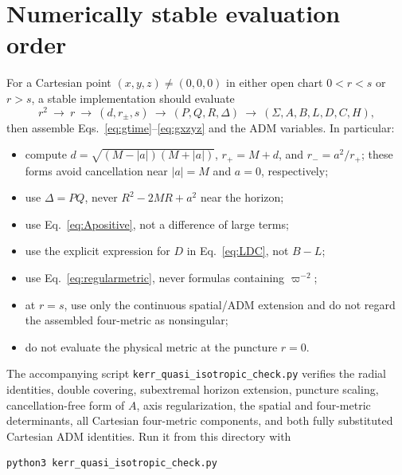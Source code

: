 \documentclass[11pt]{article}
\newcommand{\RBL}{R}
\newcommand{\vpi}{\varpi}
\begin{document}
\section{Numerically stable evaluation order}

For a Cartesian point $(x,y,z)\neq(0,0,0)$ in either open chart $0<r<s$ or $r>s$, a stable implementation should evaluate
\begin{equation}
 r^2\ \longrightarrow\ r\ \longrightarrow\ (d,r_\pm,s)\ \longrightarrow\
 (P,Q,\RBL,\Delta)\ \longrightarrow\ (\Sigma,A,B,L,D,C,H), \label{eq:evalorder}
\end{equation}
then assemble Eqs.~\eqref{eq:gtime}--\eqref{eq:gxzyz} and the ADM variables. In particular:
\begin{itemize}
 \item compute $d=\sqrt{(M-|a|)(M+|a|)}$, $r_+=M+d$, and $r_-=a^2/r_+$; these forms avoid cancellation near $|a|=M$ and $a=0$, respectively;
 \item use $\Delta=PQ$, never $\RBL^2-2M\RBL+a^2$ near the horizon;
 \item use Eq.~\eqref{eq:Apositive}, not a difference of large terms;
 \item use the explicit expression for $D$ in Eq.~\eqref{eq:LDC}, not $B-L$;
 \item use Eq.~\eqref{eq:regularmetric}, never formulas containing $\vpi^{-2}$;
 \item at $r=s$, use only the continuous spatial/ADM extension and do not regard the assembled four-metric as nonsingular;
 \item do not evaluate the physical metric at the puncture $r=0$.
\end{itemize}

The accompanying script \texttt{kerr\_quasi\_isotropic\_check.py} verifies the radial identities, double covering, subextremal horizon extension, puncture scaling, cancellation-free form of $A$, axis regularization, the spatial and four-metric determinants, all Cartesian four-metric components, and both fully substituted Cartesian ADM identities. Run it from this directory with
\begin{verbatim}
python3 kerr_quasi_isotropic_check.py
\end{verbatim}
\end{document}
